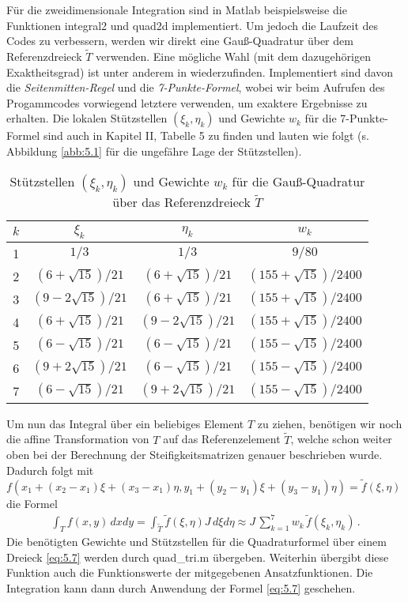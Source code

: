 Für die zweidimensionale Integration sind in Matlab beispielsweise die Funktionen {\ttfamily integral2} und {\ttfamily quad2d} implementiert. Um jedoch die Laufzeit des Codes zu verbessern, werden wir direkt eine Gauß-Quadratur über dem Referenzdreieck $\widetilde T$ verwenden. Eine mögliche Wahl (mit dem dazugehörigen Exaktheitsgrad) ist unter anderem in \cite{Quad} wiederzufinden. Implementiert sind davon die \textit{Seitenmitten-Regel} und die \textit{7-Punkte-Formel}, wobei wir  beim Aufrufen des Progammcodes vorwiegend letztere verwenden, um exaktere Ergebnisse zu erhalten. Die lokalen Stützstellen $(\xi_k,\eta_k)$ und Gewichte $w_k$ für die 7-Punkte-Formel sind auch in \cite{BraeFEM} Kapitel II, Tabelle 5 zu finden und lauten wie folgt (s. Abbildung \ref{abb:5.1} für die ungefähre Lage der Stützstellen).

\begin{table}[htpb]
\centering
\begin{tabular}[c]{|c|c|c|c|}
	\hline
	$k$ & $\xi_k$ & $\eta_k$ & $w_k$ \\
	\hline
	 1 & $1/3$ & $1/3$ & $9/80$ \\
	 2 & $(6+\sqrt{15})/21$ & $(6+\sqrt{15})/21$ & $(155+\sqrt{15})/2400$ \\
	 3 & $(9-2\sqrt{15})/21$ & $(6+\sqrt{15})/21$ & $(155+\sqrt{15})/2400$  \\
	 4 & $(6+\sqrt{15})/21$ & $(9-2\sqrt{15})/21$ & $(155+\sqrt{15})/2400$ \\
	 5 & $(6-\sqrt{15})/21$ & $(6-\sqrt{15})/21$ & $(155-\sqrt{15})/2400$ \\
	 6 & $(9+2\sqrt{15})/21$ & $(6-\sqrt{15})/21$ & $(155-\sqrt{15})/2400$ \\
	 7 & $(6-\sqrt{15})/21$ & $(9+2\sqrt{15})/21$ & $(155-\sqrt{15})/2400$ \\
	\hline
\end{tabular}
\caption{\label{tab:5.1}Stützstellen $(\xi_k,\eta_k)$ und Gewichte $w_k$ für die Gauß-Quadratur über das Referenzdreieck $\widetilde T$}
\end{table}

Um nun das Integral über ein beliebiges Element $T$ zu ziehen, benötigen wir noch die affine Transformation von $T$ auf das Referenzelement $\widetilde T$, welche schon weiter oben bei der Berechnung der Steifigkeitsmatrizen genauer beschrieben wurde. Dadurch folgt  mit $f(x_1+(x_2-x_1)\xi+(x_3-x_1)\eta,y_1+(y_2-y_1)\xi + (y_3-y_1)\eta) = \tilde f(\xi,\eta)$ die Formel
\begin{align}\label{eq:5.7}
	\int_T f(x,y) \, dxdy = \int_{\widetilde T} \tilde f(\xi,\eta)  J \, d\xi d\eta  \approx J\,  \sum_{k=1}^7 w_k \, \tilde f(\xi_k,\eta_k) \, .
\end{align}
Die benötigten Gewichte und Stützstellen für die Quadraturformel über einem Dreieck \eqref{eq:5.7}  werden durch {\ttfamily quad_tri.m} übergeben. Weiterhin übergibt diese Funktion auch die Funktionswerte der mitgegebenen Ansatzfunktionen. Die Integration kann dann durch Anwendung der Formel \eqref{eq:5.7} geschehen.


